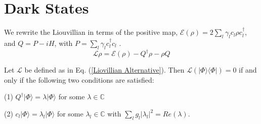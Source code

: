 %
\section{Dark States}
%
We rewrite the Liouvillian in terms of the positive map, $\mathcal{E}(\rho) = 2 \sum_l \gamma_l c_l \rho c_l^\dagger$, and $Q = P - i H$, with $P = \sum_ l \gamma_l c_l^\dagger c_l$ \cite{KrausTheorems}.
\begin{equation}\label{Liovillian Alternative}
\mathcal{L}\rho = \mathcal{E}(\rho) - Q^\dagger \rho - \rho Q 
\end{equation}
\begin{thm}\label{Theorem}
Let $\mathcal{L}$ be defined as in Eq. (\ref{Liovillian Alternative}). Then $\mathcal{L}\left( |\Phi \rangle \langle \Phi |  \right)=0$ if and only if the following two conditions are satisfied: 

(1) $Q^\dagger | \Phi \rangle = \lambda | \Phi \rangle$ for some $\lambda \in \mathbb{C}$

(2) $c_l | \Phi \rangle = \lambda_l | \Phi \rangle$ for some $\lambda_l \in \mathbb{C}$ with $\sum_l g_l |\lambda_l|^ 2 = Re ( \lambda ) $.

\end{thm}

